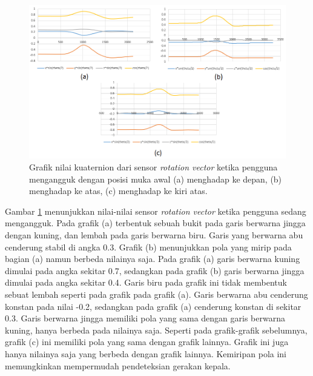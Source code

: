 \begin{figure}[htbp]
\centering
\includegraphics[scale=0.6]{Gambar/grafik-sensor-rot-vector-mengangguk.png}
\caption{Grafik nilai kuaternion dari sensor \textit{rotation vector} ketika pengguna mengangguk dengan posisi muka awal (a) menghadap ke depan, (b) menghadap ke atas, (c) menghadap ke kiri atas.} 
\label{fig:grafik-sensor-rot-vector-mengangguk}
\end{figure}

Gambar \ref{fig:grafik-sensor-rot-vector-mengangguk} menunjukkan nilai-nilai sensor \textit{rotation vector} ketika pengguna sedang mengangguk. Pada grafik (a) terbentuk sebuah bukit pada garis berwarna jingga dengan kuning, dan lembah pada garis berwarna biru. Garis yang berwarna abu cenderung stabil di angka 0.3. Grafik (b) menunjukkan pola yang mirip pada bagian (a) namun berbeda nilainya saja. Pada grafik (a) garis berwarna kuning dimulai pada angka sekitar 0.7, sedangkan pada grafik (b) garis berwarna jingga dimulai pada angka sekitar 0.4. Garis biru pada grafik ini tidak membentuk sebuat lembah seperti  pada grafik pada grafik (a). Garis berwarna abu cenderung konstan pada nilai -0.2, sedangkan pada grafik (a) cenderung konstan di sekitar 0.3. Garis berwarna jingga memiliki pola yang sama dengan garis berwarna kuning, hanya berbeda pada nilainya saja. Seperti pada grafik-grafik sebelumnya, grafik (c) ini memiliki pola yang sama dengan grafik lainnya. Grafik ini juga hanya nilainya saja yang berbeda dengan grafik lainnya. Kemiripan pola ini memungkinkan mempermudah pendeteksian gerakan kepala. 


